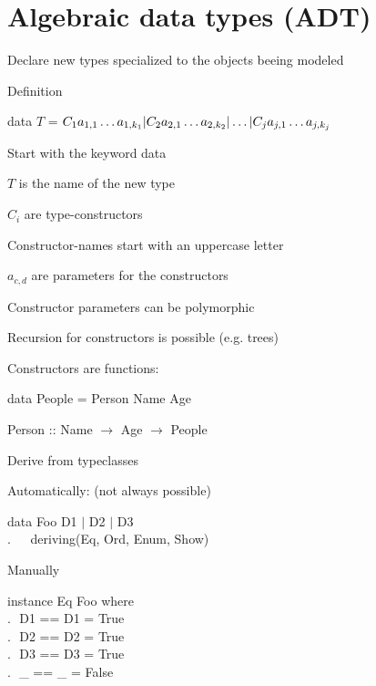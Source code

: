 \section{Algebraic data types (ADT)}
\enumstart
	\item Declare new types specialized to the objects beeing modeled
	\item Definition
	\enumstart
		\item data $T$ = $C_1 a_{1,1}\mathellipsis a_{1,k_1}| C_2 a_{2,1}\mathellipsis a_{2,k_2}| \mathellipsis | C_j a_{j,1}\mathellipsis a_{j,k_j}$
		\item Start with the keyword data
		\item $T$ is the name of the new type
		\item $C_i$ are type-constructors
		\item Constructor-names start with an uppercase letter
		\item $a_{c,d}$ are parameters for the constructors
		\item Constructor parameters can be polymorphic
		\item Recursion for constructors is possible (e.g. trees)
		\item Constructors are functions:
		\enumstart
			\item data People = Person Name Age
			\item Person :: Name $\rightarrow$ Age $\rightarrow$ People
		\enumend
		\item Derive from typeclasses
		\enumstart
			\item Automatically: (not always possible)
			\enumstart
				\item data Foo D1 $|$ D2 $|$ D3\\$.\ \ \ \ \ \ \ $deriving(Eq, Ord, Enum, Show)
			\enumend
			\item Manually
			\enumstart
				\item instance Eq Foo where\\$.\ \ \ $D1 == D1 = True\\$.\ \ \ $D2 == D2 = True\\$.\ \ \ $D3 == D3 = True\\$.\ \ \ $\_ == \_ = False
			\enumend
		\enumend
	\enumend
\enumend
